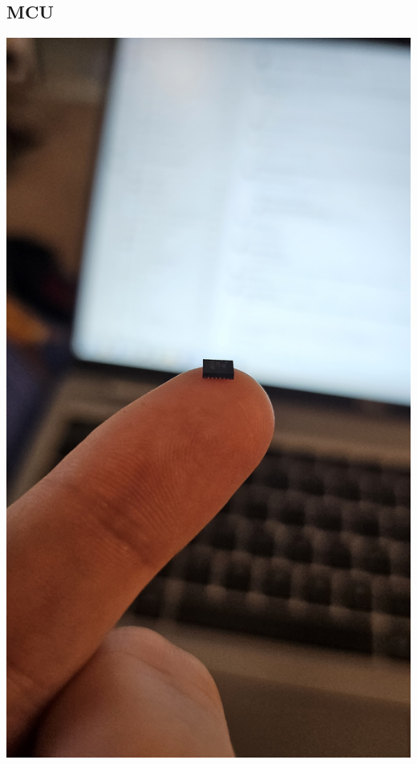 \documentclass[11pt,a4paper,titlepage]{report}
\begin{document}
	\subsection{MCU}\label{appendix:images_mcu}
	\begin{center}
		\label{picture:images_mcu_1}
		\includegraphics[width=\linewidth]{assets/MCU1.jpg}
	\end{center}
\end{document}
